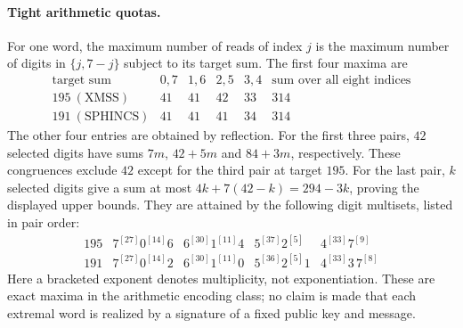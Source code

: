 \paragraph{Tight arithmetic quotas.} For one word, the maximum number of reads of index $j$ is the maximum number of digits in $\{j,7-j\}$ subject to its target sum. The first four maxima are
\[
 \begin{array}{c|rrrr|r}
 \text{target sum}&0,7&1,6&2,5&3,4&\text{sum over all eight indices}\\ \hline
 195\ (\text{XMSS})&41&41&42&33&314\\
 191\ (\text{SPHINCS})&41&41&41&34&314
 \end{array}
\]
The other four entries are obtained by reflection. For the first three pairs, $42$ selected digits have sums $7m$, $42+5m$ and $84+3m$, respectively. These congruences exclude $42$ except for the third pair at target $195$. For the last pair, $k$ selected digits give a sum at most $4k+7(42-k)=294-3k$, proving the displayed upper bounds. They are attained by the following digit multisets, listed in pair order:
\[
 \begin{array}{c|llll}
 195&7^{[27]}0^{[14]}6&6^{[30]}1^{[11]}4&5^{[37]}2^{[5]}&4^{[33]}7^{[9]}\\
 191&7^{[27]}0^{[14]}2&6^{[30]}1^{[11]}0&5^{[36]}2^{[5]}1&4^{[33]}3\,7^{[8]}
 \end{array}
\]
Here a bracketed exponent denotes multiplicity, not exponentiation. These are exact maxima in the arithmetic encoding class; no claim is made that each extremal word is realized by a signature of a fixed public key and message.


